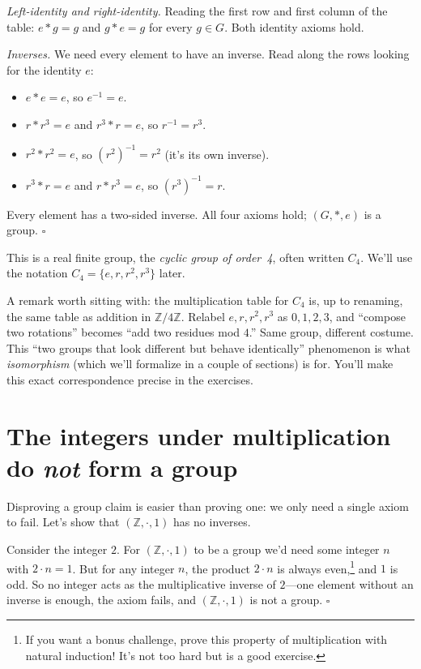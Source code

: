 \documentclass[11pt]{article}
\begin{document}
\emph{Left-identity and right-identity.} Reading the first row and first column of the table: $e * g = g$ and $g * e = g$ for every $g \in G$. Both identity axioms hold.

\emph{Inverses.} We need every element to have an inverse. Read along the rows looking for the identity $e$:
\begin{itemize}
  \item $e * e = e$, so $e^{-1} = e$.
  \item $r * r^3 = e$ and $r^3 * r = e$, so $r^{-1} = r^3$.
  \item $r^2 * r^2 = e$, so $(r^2)^{-1} = r^2$ (it's its own inverse).
  \item $r^3 * r = e$ and $r * r^3 = e$, so $(r^3)^{-1} = r$.
\end{itemize}
Every element has a two-sided inverse. All four axioms hold; $(G, *, e)$ is a group. \hfill $\square$

This is a real finite group, the \emph{cyclic group of order~4}, often written $C_4$. We'll use the notation $C_4 = \{e, r, r^2, r^3\}$ later.

A remark worth sitting with: the multiplication table for $C_4$ is, up to renaming, the same table as addition in $\mathbb{Z}/4\mathbb{Z}$. Relabel $e, r, r^2, r^3$ as $0, 1, 2, 3$, and ``compose two rotations'' becomes ``add two residues mod $4$.'' Same group, different costume. This ``two groups that look different but behave identically'' phenomenon is what \emph{isomorphism} (which we'll formalize in a couple of sections) is for. You'll make this exact correspondence precise in the exercises.

\section{The integers under multiplication do \emph{not} form a group}
Disproving a group claim is easier than proving one: we only need a single axiom to fail. Let's show that $(\mathbb{Z}, \cdot, 1)$ has no inverses.

Consider the integer $2$. For $(\mathbb{Z}, \cdot, 1)$ to be a group we'd need some integer $n$ with $2 \cdot n = 1$. But for any integer $n$, the product $2 \cdot n$ is always even,\footnote{If you want a bonus challenge, prove this property of multiplication with natural induction! It's not too hard but is a good exercise.} and $1$ is odd. So no integer acts as the multiplicative inverse of $2$---one element without an inverse is enough, the axiom fails, and $(\mathbb{Z}, \cdot, 1)$ is not a group. \hfill $\square$
\end{document}
